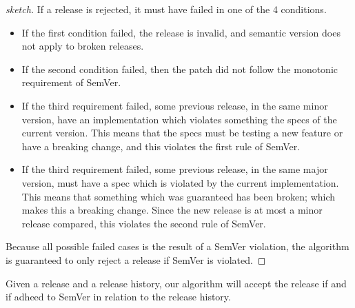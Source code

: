 \begin{proof}[sketch]
If a release is rejected, it must have failed in one of the 4 conditions. 
\begin{itemize}
  \item If the first condition failed, the release is invalid, and semantic
      version does not apply to broken releases. 
  \item If the second condition failed, then the patch did not follow the
      monotonic requirement of SemVer. 
  \item If the third requirement failed, some previous release, in the same
      minor version, have an implementation which violates something the specs
      of the current version. This means that the specs must be testing a new
      feature or have a breaking change, and this violates the first rule of
      SemVer.
  \item If the third requirement failed, some previous release, in the same
      major version,  must have a spec which is violated by the current
      implementation. This means that something which was guaranteed has been
      broken; which makes this a breaking change. Since the new release is at
      most a minor release compared, this violates the second rule of SemVer.
\end{itemize}
Because all possible failed cases is the result of a SemVer violation, the
algorithm is guaranteed to only reject a release if SemVer is violated.
\end{proof}

\begin{theorem}[Completness]
Given a release and a release history, our algorithm will accept the release if
and if adheed to SemVer in relation to the release history.
\end{theorem}

